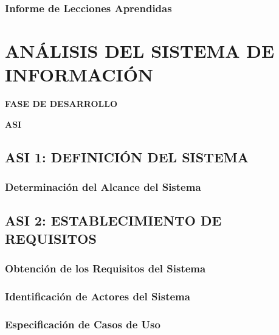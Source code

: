 \documentclass[11pt]{report}
\begin{document}
\subsection{Informe de Lecciones Aprendidas}



\newpage
\chapter{ANÁLISIS DEL SISTEMA DE INFORMACIÓN}
	\vspace{2cm}	
	\begin{center}
	{\Large \textbf{FASE DE DESARROLLO} \par}
	\end{center}
	\vspace{5cm}
	
	\begin{center}
	\Huge \textbf{ASI}\par
	\end{center}

\newpage


\section{ASI 1: DEFINICIÓN DEL SISTEMA}

\subsection{Determinación del Alcance del Sistema}


\newpage
\section{ASI 2: ESTABLECIMIENTO DE REQUISITOS}

\subsection{Obtención de los Requisitos del Sistema} 

\subsection{Identificación de Actores del Sistema} 

\subsection{Especificación de Casos de Uso}
\end{document}
